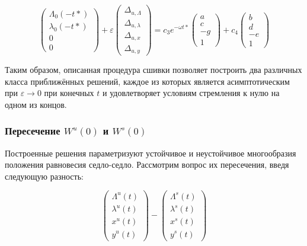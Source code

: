 \begin{equation}
\begin{pmatrix}
\Lambda_0(-t*) \\ \lambda_0(-t*) \\ 0 \\ 0
\end{pmatrix}
+ \varepsilon 
\begin{pmatrix}
\Delta_{u,\Lambda} \\ \Delta_{u,\lambda} \\ \Delta_{u,x} \\ \Delta_{u,y}
\end{pmatrix}
=
c_3 e^{- \omega t*}
\begin{pmatrix}
a \\ c \\ -g \\ 1
\end{pmatrix}
+ c_4
\begin{pmatrix}
b \\ d \\ -e \\ 1
\end{pmatrix}
\end{equation}

Таким образом, описанная процедура сшивки позволяет построить два различных класса приближённых решений, каждое из которых является асимптотическим при $\varepsilon\to 0$ при конечных $t$ и удовлетворяет условиям стремления к нулю на одном из концов.

\subsubsection{Пересечение $W^u(0)$ и $W^s(0)$}

Построенные решения параметризуют устойчивое и неустойчивое многообразия положения равновесия седло-седло. Рассмотрим вопрос их пересечения, введя следующую разность:

\begin{equation}
\begin{pmatrix} \Lambda^u(t) \\ \lambda^u(t) \\ x^u(t) \\ y^u(t) \end{pmatrix}
-
\begin{pmatrix} \Lambda^s(t) \\ \lambda^s(t) \\ x^s(t) \\ y^s(t) \end{pmatrix}
\label{eq_rashep}
\end{equation}

